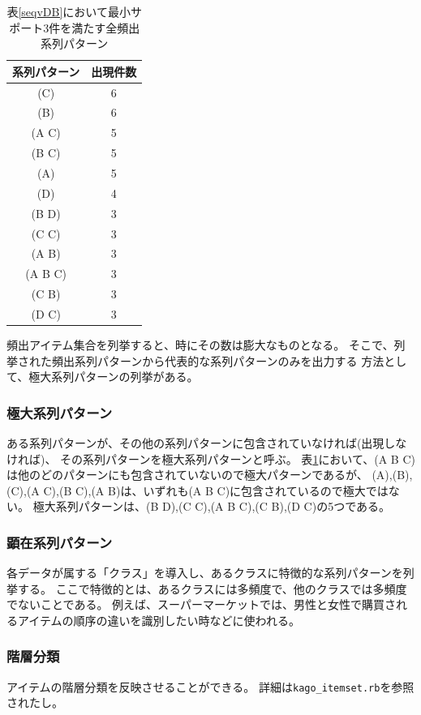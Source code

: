 \documentclass[a4paper]{jarticle}
\begin{document}
\begin{table}[htbp]
\begin{center}
\caption{表\ref{seqvDB}において最小サポート3件を満たす全頻出系列パターン\label{tbl:freqSeq}}
\begin{tabular}{cc}
\hline
系列パターン&出現件数 \\
\hline
(C)&6 \\
(B)&6 \\
(A C)&5 \\
(B C)&5 \\
(A)&5 \\
(D)&4 \\
(B D)&3 \\
(C C)&3 \\
(A B)&3 \\
(A B C)&3 \\
(C B)&3 \\
(D C)&3 \\
\hline
\end{tabular} 
\end{center}
\end{table} 


頻出アイテム集合を列挙すると、時にその数は膨大なものとなる。
そこで、列挙された頻出系列パターンから代表的な系列パターンのみを出力する
方法として、極大系列パターンの列挙がある。

\subsubsection*{極大系列パターン}
ある系列パターンが、その他の系列パターンに包含されていなければ(出現しなければ)、
その系列パターンを極大系列パターンと呼ぶ。
表\ref{tbl:freqSeq}において、(A B C)は他のどのパターンにも包含されていないので極大パターンであるが、
(A),(B),(C),(A C),(B C),(A B)は、いずれも(A B C)に包含されているので極大ではない。
極大系列パターンは、(B D),(C C),(A B C),(C B),(D C)の5つである。

\subsubsection*{顕在系列パターン}
各データが属する「クラス」を導入し、あるクラスに特徴的な系列パターンを列挙する。
ここで特徴的とは、あるクラスには多頻度で、他のクラスでは多頻度でないことである。
例えば、スーパーマーケットでは、男性と女性で購買されるアイテムの順序の違いを識別したい時などに使われる。

\subsubsection*{階層分類}
アイテムの階層分類を反映させることができる。
詳細は\verb|kago_itemset.rb|を参照されたし。
\end{document}
